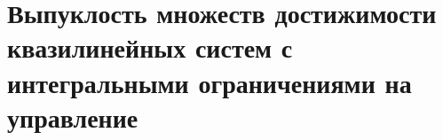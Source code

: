 \documentclass[../main.tex]{subfiles}
\begin{document}
\newpage
\section{Выпуклость множеств достижимости квазилинейных систем с интегральными ограничениями на управление}
\end{document}

